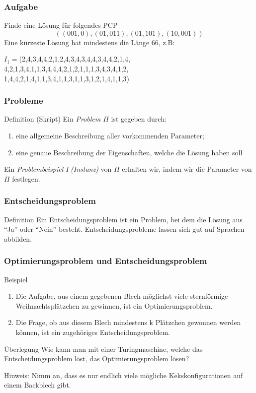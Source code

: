 \documentclass{beamer}
\begin{document}
\begin{frame}
\frametitle{Aufgabe}
Finde eine Lösung für folgendes PCP
$$ ((001,0),(01,011),(01,101),(10,001)) $$
\pause
Eine kürzeste Lösung hat mindestens die Länge 66, z.B:
\begin{center}
$ I_1 = $(2,4,3,4,4,2,1,2,4,3,4,3,4,4,3,4,4,2,1,4,\\
4,2,1,3,4,1,1,3,4,4,4,2,1,2,1,1,1,3,4,3,4,1,2,\\
1,4,4,2,1,4,1,1,3,4,1,1,3,1,1,3,1,2,1,4,1,1,3)
\end{center}
\end{frame}

\begin{frame}
 \frametitle{Probleme}
 \begin{block}{Definition (Skript)}
 Ein \emph{Problem $\Pi$} ist gegeben durch:
 \begin{enumerate}
  \item eine allgemeine Beschreibung aller vorkommenden Parameter;
  \item eine genaue Beschreibung der Eigenschaften, welche die Lösung haben soll
 \end{enumerate}
 \end{block}
 Ein \emph{Problembeispiel} \textit{I} \emph{(Instanz)} von $\Pi$ erhalten wir, indem wir die Parameter von $\Pi$ festlegen.
\end{frame}

\begin{frame}
 \frametitle{Entscheidungsproblem}
 \begin{block}{Definition}
  Ein Entscheidungsproblem ist ein Problem, bei dem die Lösung aus ``Ja'' oder ``Nein'' besteht. 
  Entscheidungsprobleme lassen sich gut auf Sprachen abbilden.
 \end{block}
\end{frame}

\begin{frame}
 \frametitle{Optimierungsproblem und Entscheidungsproblem}
 \begin{block}{Beispiel}
  \begin{enumerate}
   \item Die Aufgabe, aus einem gegebenen Blech möglichst viele sternförmige Weihnachtsplätzchen zu gewinnen, ist ein Optimierungsproblem.
   \item Die Frage, ob aus diesem Blech mindestens k Plätzchen gewonnen werden können, ist ein zugehöriges Entscheidungsproblem.
  \end{enumerate}
 \end{block}
 \begin{block}{Überlegung}
  Wie kann man mit einer Turingmaschine, welche das Entscheidungsproblem löst, das Optimierungsproblem lösen?
 \end{block}
 Hinweis: Nimm an, dass es nur endlich viele mögliche Kekskonfigurationen auf einem Backblech gibt.
\end{frame}
\end{document}
